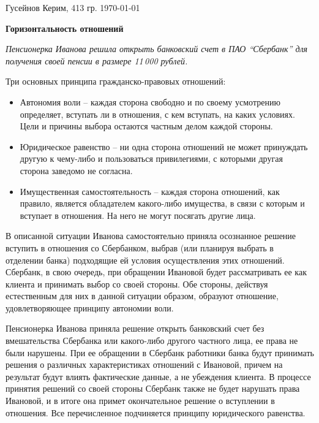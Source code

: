 \documentclass[a4paper, 12pt]{article}
\begin{document}
\noindent
Гусейнов Керим, 413 гр.
\hfill 
\today

\begin{center}\bf
Горизонтальность отношений
\end{center}

\textit{Пенсионерка Иванова решила открыть банковский счет в ПАО \enquote{Сбербанк} для получения своей пенсии в размере 11\,000 рублей.}


Три основных принципа гражданско-правовых отношений:
\begin{itemize}
\item Автономия воли -- каждая сторона свободно и по своему усмотрению определяет, вступать ли в отношения, с кем вступать, на каких условиях. Цели и причины выбора остаются частным делом каждой стороны. 
\item Юридическое равенство -- ни одна сторона отношений не может принуждать другую к чему-либо и пользоваться привилегиями, с которыми другая сторона заведомо не согласна. 
\item Имущественная самостоятельность -- каждая сторона отношений, как правило, является обладателем какого-либо имущества, в связи с которым и вступает в отношения. На него не могут посягать другие лица. 
\end{itemize}

В описанной ситуации Иванова самостоятельно приняла осознанное решение вступить в отношения со Сбербанком, выбрав (или планируя выбрать в отделении банка) подходящие ей условия осуществления этих отношений. 
Сбербанк, в свою очередь, при обращении Ивановой будет рассматривать ее как клиента и принимать выбор со своей стороны. 
Обе стороны, действуя естественным для них в данной ситуации образом, образуют отношение, удовлетворяющее принципу автономии воли. 

Пенсионерка Иванова приняла решение открыть банковский счет без вмешательства Сбербанка или какого-либо другого частного лица, ее права не были нарушены. 
При ее обращении в Сбербанк работники банка будут принимать решения о различных характеристиках отношений с Ивановой, причем на результат будут влиять фактические данные, а не убеждения клиента. 
В процессе принятия решений со своей стороны Сбербанк также не будет нарушать права Ивановой, и в итоге она примет окончательное решение о вступлении в отношения. 
Все перечисленное подчиняется принципу юридического равенства. 
\end{document}

